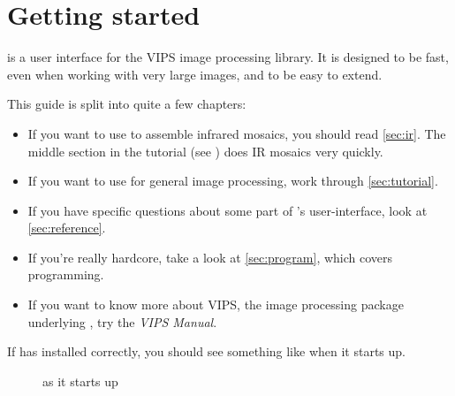 \chapter{Getting started}

\nip{} is a user interface for the VIPS image processing library. It is
designed to be fast, even when working with very large images, and to
be easy to extend.  

This guide is split into quite a few chapters:

\begin{itemize}

\item
If you want to use \nip{} to assemble infrared mosaics, you should read
\cref{sec:ir}. The middle section in the tutorial (see )
does IR mosaics very quickly.

\item
If you want to use \nip{} for general image processing, work through 
\cref{sec:tutorial}.

\item
If you have specific questions about some part of \nip{}'s user-interface, look
at \cref{sec:reference}.

\item
If you're really hardcore, take a look at \cref{sec:program}, which covers
programming.

\item
If you want to know more about VIPS, the image processing package
underlying \nip{}, try the \emph{VIPS Manual}.

\end{itemize}

If \nip{} has installed correctly, you should see something like
 when it starts up.

\begin{figure}
\caption{\nip{} as it starts up}
\label{fg:introwin}
\end{figure}


